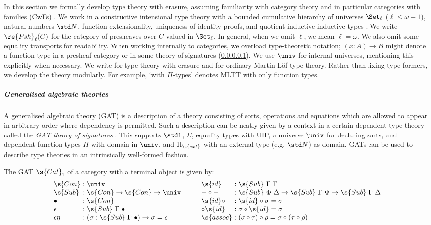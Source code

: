 \documentclass[a4paper,UKenglish,cleveref,autoref,thm-restate]{lipics-v2021}
\begin{document}
In this section we formally develop type theory with erasure, assuming
familiarity with category theory and in particular categories with families
(CwFs) \cite{Castellan2019-sh}. We work in a constructive intensional type
theory with a bounded cumulative hierarchy of universes $\Set_\ell$ ($\ell \leq
\omega + 1$), natural numbers $\std N$, function extensionality, uniqueness of
identity proofs, and quotient inductive-inductive types
\cite{Altenkirch2018-nd}. We write $\re{Psh}_{\ell}(C)$ for the category of
presheaves over $C$ valued in $\Set_\ell$. In general, when we omit $\ell$, we
mean $\ell = \omega$. We also omit some equality transports for readability.
When working internally to categories, we overload type-theoretic notation; $(x
: A) \to B$ might denote a function type in a presheaf category
\cite{Hofmann1997-on} or in some theory of signatures (\cref{par:gat}). We use
$\univ$ for internal universes, mentioning this explicitly when necessary. We
write \ZTT for type theory with erasure and \TT for ordinary Martin-L\"of type
theory. Rather than fixing type formers, we develop the theory modularly. For
example, `\TT with $\Pi$-types' denotes MLTT with only function types.

\subparagraph{Generalised algebraic theories}\label{par:gat}

A generalised algebraic theory (GAT) \cite{Cartmell1986-ig} is a description of
a theory consisting of sorts, operations and equations which are allowed to
appear in arbitrary order where dependency is permitted. Such a description can
be neatly given by a context in a certain dependent type theory called the
\emph{GAT theory of signatures} \cite{Kovacs2023-gq}. This supports $\std 1$,
$\Sigma$, equality types with UIP, a universe $\univ$ for declaring sorts, and
dependent function types $\Pi$ with domain in $\univ$, and $\Pi_\s{ext}$ with an
external type (e.g. $\std N$) as domain. GATs can be used to describe type
theories in an intrinsically well-formed fashion.
\begin{example}\label{ex:cat1}
The GAT $\s{Cat}_1$ of a category with a terminal object is given by:
\[\begin{array}{l@{\ }l}
  \s{Con} &: \univ \\
  \s{Sub} &: \s{Con} \to \s{Con} \to \univ \\
  \bullet &: \s{Con} \\
  \epsilon &: \s{Sub}\ \Gamma\ \bullet \\
  \epsilon\eta &: (\sigma : \s{Sub}\ \Gamma\ \bullet) \to \sigma = \epsilon
\end{array}
\qquad
\begin{array}{l@{\ }l}
  \s{id} &: \s{Sub}\ \Gamma\ \Gamma \\
  -\circ- &: \s{Sub}\ \Phi\ \Delta \to \s{Sub}\ \Gamma\ \Phi \to \s{Sub}\ \Gamma\ \Delta \\
  \s{id}\circ &: \s{id} \circ \sigma = \sigma \\
  \circ\s{id} &: \sigma \circ \s{id} = \sigma \\
  \s{assoc} &: (\sigma \circ \tau) \circ \rho = \sigma \circ (\tau \circ \rho)
\end{array}\]
\end{example}
\end{document}

